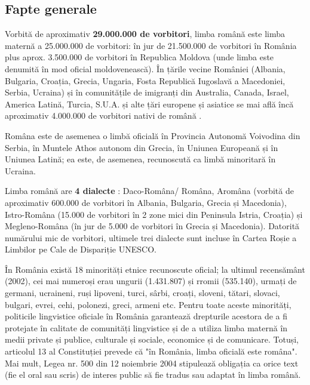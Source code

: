 \documentclass[]{../../metanetpaper}
\begin{document}
\begin{multicols}{2}
\subsection{Fapte generale}
Vorbită de aproximativ \textbf{29.000.000 de vorbitori}\cite{vintila}, limba română este limba maternă a 25.000.000 de vorbitori: în jur de 21.500.000 de vorbitori în România \cite{stat1} plus aprox. 3.500.000 de vorbitori în Republica Moldova \cite{stat2} (unde limba este denumită în mod oficial moldovenească). În țările vecine României (Albania, Bulgaria, Croația, Grecia, Ungaria, Fosta Republică Iugoslavă a Macedoniei, Serbia, Ucraina) și în comunitățile de imigranți din Australia, Canada, Israel, America Latină, Turcia, S.U.A. și alte țări europene și asiatice se mai află încă aproximativ 4.000.000 de vorbitori nativi de română \cite{urlRom_diaspora}.

Româna este de asemenea o limbă oficială în Provincia Autonomă Voivodina din Serbia, în Muntele Athos autonom din Grecia, în Uniunea Europeană și în Uniunea Latină; ea este, de asemenea, recunoscută ca limbă minoritară în Ucraina.

Limba română are \textbf{4 dialecte} \cite{sala}: Daco-Româna/ Româna, Aromâna (vorbită de aproximativ 600.000 de vorbitori în Albania, Bulgaria, Grecia și Macedonia), Istro-Româna (15.000 de vorbitori în 2 zone mici din Peninsula Istria, Croația) și Megleno-Româna (în jur de 5.000 de vorbitori în Grecia și Macedonia). Datorită numărului mic de vorbitori, ultimele trei dialecte sunt incluse în Cartea Roșie a Limbilor pe Cale de Dispariție UNESCO.

În România există 18 minorități etnice recunoscute oficial; la ultimul recensământ (2002), cei mai numeroși erau ungurii (1.431.807) și rromii (535.140), urmați de germani, ucraineni, ruși lipoveni, turci, sârbi, croați, sloveni, tătari, slovaci, bulgari, evrei, cehi, polonezi, greci, armeni etc. Pentru toate aceste minorități, politicile lingvistice oficiale în România garantează drepturile acestora de a fi protejate în calitate de comunități lingvistice și de a utiliza limba maternă în medii private și publice, culturale și sociale, economice și de comunicare. Totuși, articolul 13 al Constituției prevede că "în România, limba oficială este româna". Mai mult, Legea nr. 500 din 12 noiembrie 2004 stipulează obligația ca orice text (fie el oral sau scris) de interes public să fie tradus sau adaptat în limba română\cite{urlEFNIL}.


\end{multicols}
\end{document}
